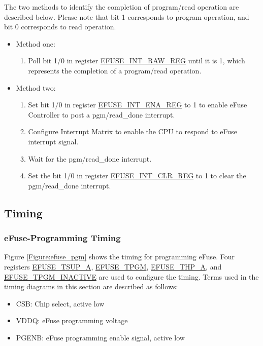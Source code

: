 \documentclass[main\_\_EN.tex]{subfiles}
\begin{document}
    The two methods to identify the completion of program/read operation are described below. Please note that bit 1 corresponds to program operation, and bit 0 corresponds to read operation.
    \begin{itemize}
    \item Method one:
        \begin{enumerate}
            \item Poll bit 1/0 in register \hyperref[regdesc:EFUSEINTRAWREG]{EFUSE\_INT\_RAW\_REG} until it is 1, which represents the completion of a program/read operation.
        \end{enumerate}
    \item Method two:
        \begin{enumerate}
            \item Set bit 1/0 in register \hyperref[regdesc:EFUSEINTENAREG]{EFUSE\_INT\_ENA\_REG} to 1 to enable eFuse Controller to post a pgm/read\_done interrupt.
            \item Configure Interrupt Matrix to enable the CPU to respond to eFuse interrupt signal.
            \item Wait for the pgm/read\_done interrupt.
            \item Set the bit 1/0 in register \hyperref[regdesc:EFUSEINTCLRREG]{EFUSE\_INT\_CLR\_REG} to 1 to clear the pgm/read\_done interrupt.
    \end{enumerate}
\end{itemize}

\subsection{Timing}
\subsubsection{eFuse-Programming Timing}\label{eFuse-Programming Timing}
Figure \ref{Figure:efuse_pgm} shows the timing for programming eFuse. Four registers \hyperref[fielddesc:EFUSETSUPA]{EFUSE\_TSUP\_A}, \hyperref[fielddesc:EFUSETPGM]{EFUSE\_TPGM}, \hyperref[fielddesc:EFUSETHPA]{EFUSE\_THP\_A}, and \hyperref[fielddesc:EFUSETPGMINACTIVE]{EFUSE\_TPGM\_INACTIVE} are used to configure the timing. Terms used in the timing diagrams in this section are described as follows:

\begin{itemize}
\item CSB: Chip select, active low
\item VDDQ: eFuse programming voltage
\item PGENB: eFuse programming enable signal, active low
\end{itemize}
\end{document}
